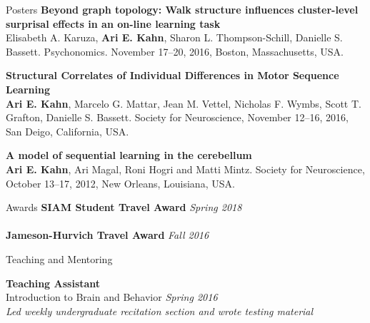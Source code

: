 \documentclass{resume} %
\begin{document}
\begin{rSection}{Posters}
\textbf{Beyond graph topology: Walk structure influences cluster-level surprisal effects in an on-line learning task} \\
Elisabeth A. Karuza, \textbf{Ari E. Kahn}, Sharon L. Thompson-Schill, Danielle S. Bassett. Psychonomics. November 17--20, 2016, Boston, Massachusetts, USA.

\textbf{Structural Correlates of Individual Differences in Motor Sequence Learning} \\
\textbf{Ari E. Kahn}, Marcelo G. Mattar, Jean M. Vettel, Nicholas F. Wymbs, Scott T. Grafton, Danielle S. Bassett. Society for Neuroscience, November 12--16, 2016, San Deigo, California, USA.

\textbf{A model of sequential learning in the cerebellum} \\
\textbf{Ari E. Kahn}, Ari Magal, Roni Hogri and Matti Mintz.
Society for Neuroscience, October 13--17, 2012, New Orleans, Louisiana, USA.
\end{rSection}

\begin{rSection}{Awards}
    \textbf{SIAM Student Travel Award} \hfill \emph{Spring 2018} \\
    \\
    \textbf{Jameson-Hurvich Travel Award} \hfill \emph{Fall 2016} \\
\end{rSection}


\begin{rSection}{Teaching and Mentoring}

\textbf{Teaching Assistant} \\
Introduction to Brain and Behavior \hfill \emph{Spring 2016} \\
\emph{Led weekly undergraduate recitation section and wrote testing material}
\end{rSection}

\end{document}
